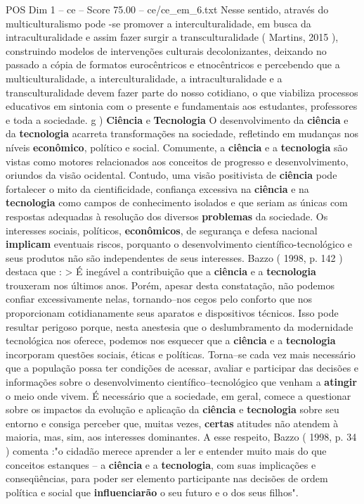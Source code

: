 \begin{textsample}{POS Dim 1 – ce – Score 75.00 – ce/ce\_em\_6.txt}
Nesse sentido, através do multiculturalismo pode -se promover a interculturalidade, em busca da intraculturalidade e assim fazer surgir a transculturalidade ( Martins, 2015 ), construindo modelos de intervenções culturais decolonizantes, deixando no passado a cópia de formatos eurocêntricos e etnocêntricos e percebendo que a multiculturalidade, a interculturalidade, a intraculturalidade e a transculturalidade devem fazer parte do nosso cotidiano, o que viabiliza processos educativos em sintonia com o presente e fundamentais aos estudantes, professores e toda a sociedade. g ) \textbf{Ciência} e \textbf{Tecnologia} O desenvolvimento da \textbf{ciência} e da \textbf{tecnologia} acarreta transformações na sociedade, refletindo em mudanças nos níveis \textbf{econômico}, político e social.
Comumente, a \textbf{ciência} e a \textbf{tecnologia} são vistas como motores relacionados aos conceitos de progresso e desenvolvimento, oriundos da visão ocidental.
Contudo, uma visão positivista de \textbf{ciência} pode fortalecer o mito da cientificidade, confiança excessiva na \textbf{ciência} e na \textbf{tecnologia} como campos de conhecimento isolados e que seriam as únicas com respostas adequadas à resolução dos diversos \textbf{problemas} da sociedade.
Os interesses sociais, políticos, \textbf{econômicos}, de segurança e defesa nacional \textbf{implicam} eventuais riscos, porquanto o desenvolvimento científico-tecnológico e seus produtos não são independentes de seus interesses.
Bazzo ( 1998, p. 142 ) destaca que : > É inegável a contribuição que a \textbf{ciência} e a \textbf{tecnologia} trouxeram nos últimos anos.
Porém, apesar desta constatação, não podemos confiar excessivamente nelas, tornando–nos cegos pelo conforto que nos proporcionam cotidianamente seus aparatos e dispositivos técnicos.
Isso pode resultar perigoso porque, nesta anestesia que o deslumbramento da modernidade tecnológica nos oferece, podemos nos esquecer que a \textbf{ciência} e a \textbf{tecnologia} incorporam questões sociais, éticas e políticas.
Torna–se cada vez mais necessário que a população possa ter condições de acessar, avaliar e participar das decisões e informações sobre o desenvolvimento científico–tecnológico que venham a \textbf{atingir} o meio onde vivem.
É necessário que a sociedade, em geral, comece a questionar sobre os impactos da evolução e aplicação da \textbf{ciência} e \textbf{tecnologia} sobre seu entorno e consiga perceber que, muitas vezes, \textbf{certas} atitudes não atendem à maioria, mas, sim, aos interesses dominantes.
A esse respeito, Bazzo ( 1998, p. 34 ) comenta :"o cidadão merece aprender a ler e entender muito mais do que conceitos estanques – a \textbf{ciência} e a \textbf{tecnologia}, com suas implicações e conseqüências, para poder ser elemento participante nas decisões de ordem política e social que \textbf{influenciarão} o seu futuro e o dos seus filhos".

\end{textsample}
